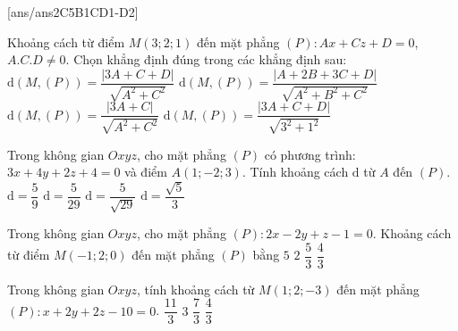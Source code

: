 \TN
{}[ans/ans2C5B1CD1-D2]
\begin{ex}%
	Khoảng cách từ điểm $M\left(3;2;1\right)$ đến mặt phẳng $(P)\colon Ax+Cz+D=0$, $A.C.D\ne 0$. Chọn khẳng định đúng trong các khẳng định sau:
	\choice
	{\True $\mathrm{d}(M,(P))=\dfrac{\left| 3A+C+D\right|}{\sqrt{A^2+C^2}}$}
	{$\mathrm{d}(M,(P))=\dfrac{\left| A+2B+3C+D\right|}{\sqrt{A^2+B^2+C^2}}$}
	{$\mathrm{d}(M,(P))=\dfrac{\left| 3A+C\right|}{\sqrt{A^2+C^2}}$}
	{$\mathrm{d}(M,(P))=\dfrac{\left| 3A+C+D\right|}{\sqrt{3^2+1^2}}$}
\end{ex}

\begin{ex}%
	Trong không gian $Oxyz$, cho mặt phẳng $(P)$ có phương trình: $3x+4y+2z+4=0$ và điểm $A(1;-2;3)$. Tính khoảng cách $\mathrm{d}$ từ $A$ đến $(P)$.
	\choice
	{$\mathrm{d}=\dfrac{5}{9}$}
	{$\mathrm{d}=\dfrac{5}{29}$}
	{\True $\mathrm{d}=\dfrac{5}{\sqrt{29}}$}
	{$\mathrm{d}=\dfrac{\sqrt{5}}{3}$}
\end{ex}

\begin{ex}%
	Trong không gian $Oxyz$, cho mặt phẳng $(P)\colon 2x-2y+z-1=0$. Khoảng cách từ điểm $M\left(-1;2;0\right)$ đến mặt phẳng $(P)$ bằng
	\choice
	{$5$}
	{$2$}
	{\True $\dfrac{5}{3}$}
	{$\dfrac{4}{3}$}
\end{ex}

\begin{ex}%
	Trong không gian $Oxyz$, tính khoảng cách từ $M\left(1;2;-3\right)$ đến mặt phẳng $(P)\colon x+2y+2z-10=0$.
	\choice
	{\True $\dfrac{11}{3}$}
	{$3$}
	{$\dfrac{7}{3}$}
	{$\dfrac{4}{3}$}
\end{ex}

